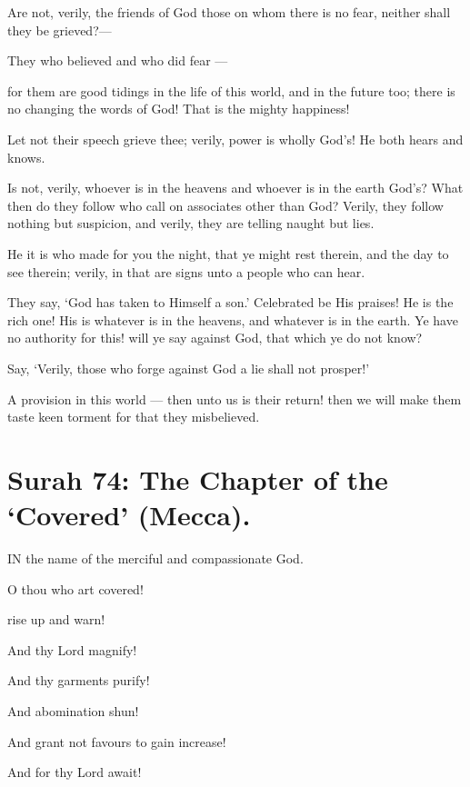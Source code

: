 \documentclass[fontsize=14pt, letterpaper, notitlepage, openany, DIV=12]{scrbook} %
\begin{document}
\noindent[10:62]
Are not, verily, the friends of God those on whom there is no fear, neither shall they be
grieved?---

\noindent[10:63]
They who believed and who did fear ---

\noindent[10:64]
for them are good tidings in the life of this world, and in the future too; there is no
changing the words of God! That is the mighty happiness!

\noindent[10:65]
Let not their speech grieve thee; verily, power is wholly God's! He both hears and
knows.

\noindent[10:66]
Is not, verily, whoever is in the heavens and whoever is in the earth God's? What then do
they follow who call on associates other than God? Verily, they follow nothing but suspicion,
and verily, they are telling naught but lies.

\noindent[10:67]
He it is who made for you the night, that ye might rest therein, and the day to see therein;
verily, in that are signs unto a people who can hear.

\noindent[10:68]
They say, `God has taken to Himself a son.' Celebrated be His praises! He is the rich
one! His is whatever is in the heavens, and whatever is in the earth. Ye have no authority for
this! will ye say against God, that which ye do not know?

\noindent[10:69]
Say, `Verily, those who forge against God a lie shall not prosper!'

\noindent[10:70]
A provision in this world --- then unto us is their return! then we will make them taste
keen torment for that they misbelieved.


\section{Surah 74: The Chapter of the `Covered' (Mecca).}


IN the name of the merciful and compassionate God.

\noindent[74:1]
O thou who art covered!

\noindent[74:2]
rise up and warn!

\noindent[74:3]
And thy Lord magnify!

\noindent[74:4]
And thy garments purify!

\noindent[74:5]
And abomination shun!

\noindent[74:6]
And grant not favours to gain increase!

\noindent[74:7]
And for thy Lord await!
\end{document}
